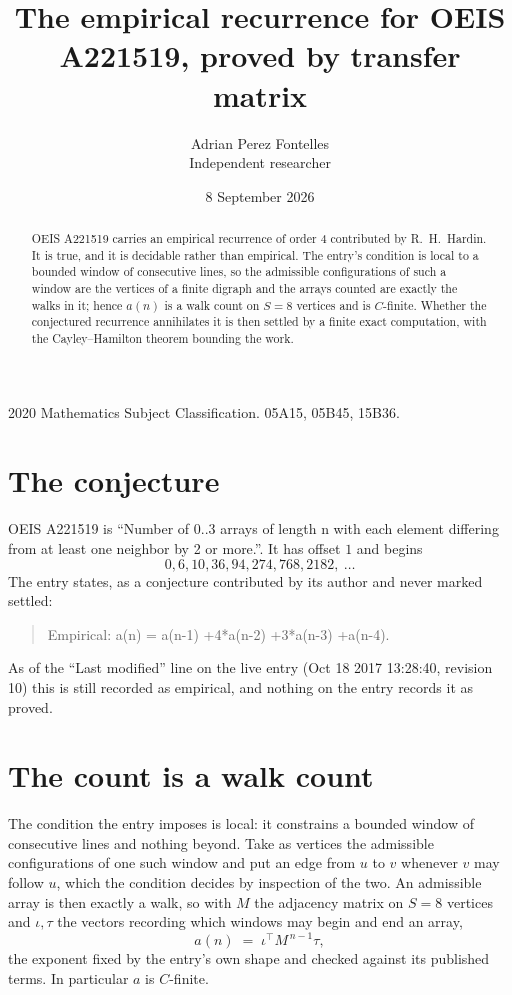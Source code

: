 \documentclass[11pt,a4paper]{article}
\title{The empirical recurrence for OEIS A221519, proved by transfer matrix}
\author{Adrian Perez Fontelles\\ \small Independent researcher}
\date{8 September 2026}
\theoremstyle{plain}
\theoremstyle{definition}
\begin{document}
\maketitle

\begin{abstract}
OEIS A221519 carries an empirical recurrence of order $4$ contributed by R.~H.~Hardin. It is
true, and it is decidable rather than empirical. The entry's condition is local to a bounded window of consecutive lines, so
the admissible configurations of such a window are the vertices of a finite digraph and the
arrays counted are exactly the walks in it; hence $a(n)$ is a walk count on $S=8$ vertices
and is $C$-finite. Whether the conjectured recurrence annihilates it is then settled by a
finite exact computation, with the Cayley--Hamilton theorem bounding the work.
\end{abstract}

\noindent\small 2020 Mathematics Subject Classification. 05A15, 05B45, 15B36.\normalsize

\section{The conjecture}

OEIS A221519 is ``Number of 0..3 arrays of length n with each element differing from at least one neighbor by 2 or more.''. It has offset $1$ and begins
\[
0, 6, 10, 36, 94, 274, 768, 2182,\ \dots
\]
The entry states, as a conjecture contributed by its author and never marked settled:
\begin{quote}
Empirical: a(n) = a(n-1) +4*a(n-2) +3*a(n-3) +a(n-4).
\end{quote}
As of the ``Last modified'' line on the live entry (Oct 18 2017 13:28:40, revision 10) this is still
recorded as empirical, and nothing on the entry records it as proved.

\section{The count is a walk count}

The condition the entry imposes is local: it constrains a bounded window of consecutive lines and nothing beyond. Take as
vertices the admissible configurations of one such window and put an edge from $u$ to $v$
whenever $v$ may follow $u$, which the condition decides by inspection of the two. An
admissible array is then exactly a walk, so with $M$ the adjacency matrix on $S=8$ vertices
and $\iota,\tau$ the vectors recording which windows may begin and end an array,
\[
a(n)\;=\;\iota^{\!\top}M^{\,n-1}\tau ,
\]
the exponent fixed by the entry's own shape and checked against its published terms. In
particular $a$ is $C$-finite.
\end{document}
